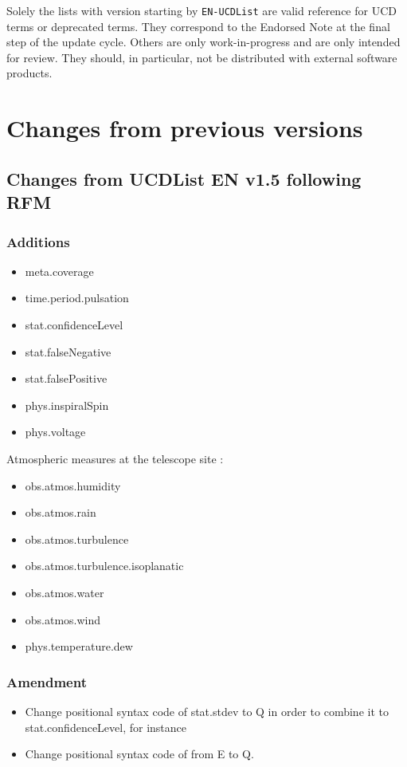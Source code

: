 \documentclass[11pt,a4paper]{ivoa}
\begin{document}
Solely the lists with version starting by \texttt{EN-UCDList} are valid reference for UCD 
terms or deprecated terms. They correspond to the Endorsed Note at the final step of the 
update cycle. Others are only work-in-progress and are only intended
for review.   They should, in particular, not be distributed with
external software products.

\section{Changes from previous versions}
\subsection{Changes from UCDList EN v1.5 following RFM}
\subsubsection*{Additions}
\begin{itemize}
\item meta.coverage
\item time.period.pulsation
\item stat.confidenceLevel 
\item stat.falseNegative
\item stat.falsePositive
\item phys.inspiralSpin
\item phys.voltage
\end{itemize}
Atmospheric measures at the telescope site :
\begin{itemize}
\item obs.atmos.humidity
\item obs.atmos.rain
\item obs.atmos.turbulence 
\item obs.atmos.turbulence.isoplanatic
\item obs.atmos.water
\item obs.atmos.wind
\item phys.temperature.dew
\end{itemize}

\subsubsection*{Amendment}
\begin{itemize}
\item Change positional syntax code of stat.stdev to Q in order to combine it to stat.confidenceLevel, for instance  
\item Change positional syntax code of  from E to Q.
\end{itemize}
\end{document}
